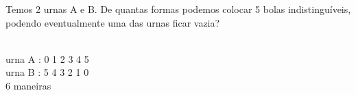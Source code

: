 \begin{ex}
 	Temos 2 urnas A e B. De quantas formas podemos colocar 5 bolas indistinguíveis, podendo eventualmente uma das urnas ficar vazia?
 	 \begin{sol}
 	   \phantom{A} \\
 	    urna A : 0 1 2 3 4 5 \\
 	    urna B : 5 4 3 2 1 0 \\
 	    6 maneiras 
 	    
 	    
 	 \end{sol}
\end{ex}